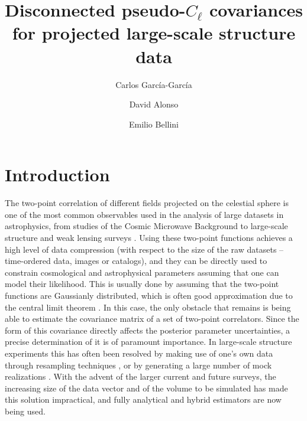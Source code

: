 \documentclass[a4paper,11pt]{article}
\title{\boldmath Disconnected pseudo-$C_\ell$ covariances for projected large-scale structure data}
\author[a]{Carlos Garc\'{i}a-Garc\'{i}a}
\author[b]{David Alonso}
\author[b]{Emilio Bellini}
\affiliation[a]{Instituto de Física Fundamental, Consejo Superior de Investigaciones Científicas, c/. Serrano 123, E–28006, Madrid, Spain}
\affiliation[b]{Oxford Astrophysics, Department of Physics, Keble Road, Oxford, OX1 3RH, UK}
\begin{document}
  \maketitle
  \flushbottom

  \section{Introduction}\label{sec:intro}
    The two-point correlation of different fields projected on the celestial sphere is one of the most common observables used in the analysis of large datasets in astrophysics, from studies of the Cosmic Microwave Background \citep{1995PhRvL..74.4369B,1997PhRvD..55.5895T,1998PhRvD..57.2117B,2001PhRvD..64f3001T,2002ApJ...567....2H,2003PhRvD..67b3001W} to large-scale structure and weak lensing surveys \cite{2000MNRAS.317L..23H,2001ApJ...555..547H,2001MNRAS.325.1603E,2011arXiv1112.5723H,2016MNRAS.456.1508K,2018MNRAS.476.1050B,2018arXiv181208182X,2019MNRAS.tmp.1446C,2019PASJ...71...43H}. Using these two-point functions achieves a high level of data compression (with respect to the size of the raw datasets -- time-ordered data, images or catalogs), and they can be directly used to constrain cosmological and astrophysical parameters assuming that one can model their likelihood. This is usually done by assuming that the two-point functions are Gaussianly distributed, which is often good approximation due to the central limit theorem \cite{2008PhRvD..77j3013H,2018MNRAS.477.4879S}. In this case, the only obstacle that remains is being able to estimate the covariance matrix of a set of two-point correlators. Since the form of this covariance directly affects the posterior parameter uncertainties, a precise determination of it is of paramount importance. In large-scale structure experiments this has often been resolved by making use of one's own data through resampling techniques \cite{tukey1958,1984MNRAS.210P..19B,1993ApJ...406L..47H,2002ApJ...571..172Z,2016arXiv160600233E}, or by generating a large number of mock realizations \cite{2013MNRAS.428.1036M,2018MNRAS.479...94A,2019MNRAS.485.2806B}. With the advent of the larger current and future surveys, the increasing size of the data vector and of the volume to be simulated has made this solution impractical, and fully analytical and hybrid estimators are now being used.
  
\end{document}
